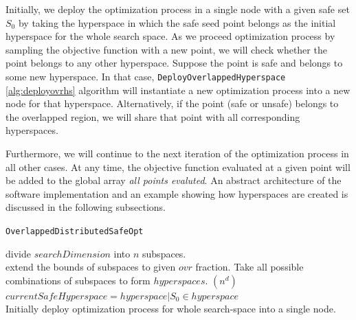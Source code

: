 Initially, we deploy the optimization process in a single node with a given safe set $S_0$ by taking the hyperspace in which the safe seed point belongs as the initial hyperspace for the whole search space. As we proceed optimization process by sampling the objective function with a new point, we will check whether the point belongs to any other hyperspace. 
Suppose the point is safe and belongs to some new hyperspace. In that case, \texttt{DeployOverlappedHyperspace} \ref{alg:deployovrhs} algorithm will instantiate a new optimization process into a new node for that hyperspace. Alternatively, if the point (safe or unsafe) belongs to the overlapped region, we will share that point with all corresponding hyperspaces.

Furthermore, we will continue to the next iteration of the optimization process in all other cases. At any time, the objective function evaluated at a given point will be added to the global array \textit{all points evaluted}. An abstract architecture of the software implementation and an example showing how hyperspaces are created is discussed in the following subsections.


\begin{algorithm}[H]
	\caption{\texttt{OverlappedDistributedSafeOpt}}
	\label{alg:ovrdsbo}
	{
		divide $searchDimension$ into $n$ subspaces.\\
		extend the bounds of subspaces to given $ovr$ fraction.
	}
	Take all possible combinations of subspaces to form $hyperspaces$. $(n^d)$\\
	$currentSafeHyperspace = hyperspace | S_0 \in hyperspace$\\
	Initially deploy optimization process for whole search-space into a single node.\\		
\end{algorithm}


